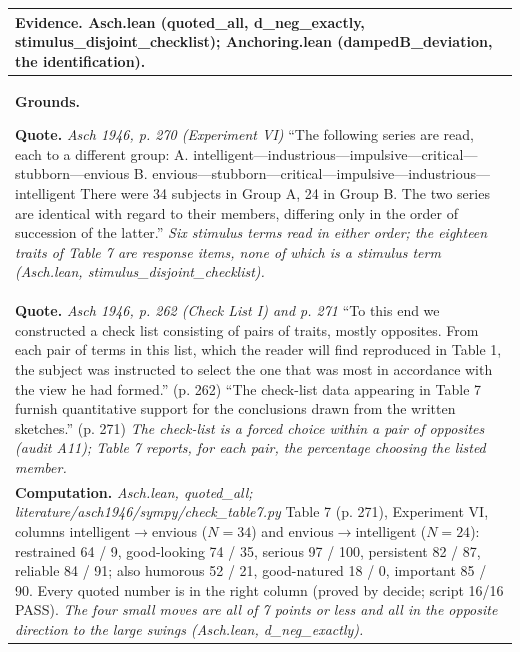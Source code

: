 \documentclass[10pt]{article}
\theoremstyle{definition}
\newlength{\fullw}\setlength{\fullw}{25.9cm}
\begin{document}
{\begin{longtable}{|p{0.9cm}|p{12.2cm}|p{12.2cm}|}
\multicolumn{3}{|p{\fullw}|}{\textbf{Evidence.} Asch.lean (quoted\_all, d\_neg\_exactly, stimulus\_disjoint\_checklist); Anchoring.lean (dampedB\_deviation, the identification).} \\ \hline
\multicolumn{3}{|p{\fullw}|}{\textbf{Grounds.}\par \textbf{Quote.} \textit{Asch 1946, p. 270 (Experiment VI)} \newline ``The following series are read, each to a different group: A. intelligent---industrious---impulsive---critical---stubborn---envious B. envious---stubborn---critical---impulsive---industrious---intelligent There were 34 subjects in Group A, 24 in Group B. The two series are identical with regard to their members, differing only in the order of succession of the latter.'' \newline \textit{Six stimulus terms read in either order; the eighteen traits of Table 7 are response items, none of which is a stimulus term (Asch.lean, stimulus\_disjoint\_checklist).}} \\
\multicolumn{3}{|p{\fullw}|}{\textbf{Quote.} \textit{Asch 1946, p. 262 (Check List I) and p. 271} \newline ``To this end we constructed a check list consisting of pairs of traits, mostly opposites. From each pair of terms in this list, which the reader will find reproduced in Table 1, the subject was instructed to select the one that was most in accordance with the view he had formed.'' (p. 262) ``The check-list data appearing in Table 7 furnish quantitative support for the conclusions drawn from the written sketches.'' (p. 271) \newline \textit{The check-list is a forced choice within a pair of opposites (audit A11); Table 7 reports, for each pair, the percentage choosing the listed member.}} \\
\multicolumn{3}{|p{\fullw}|}{\textbf{Computation.} \textit{Asch.lean, quoted\_all; literature/asch1946/sympy/check\_table7.py} \newline Table 7 (p. 271), Experiment VI, columns intelligent$\to$envious ($N = 34$) and envious$\to$intelligent ($N = 24$): restrained 64 / 9, good-looking 74 / 35, serious 97 / 100, persistent 82 / 87, reliable 84 / 91; also humorous 52 / 21, good-natured 18 / 0, important 85 / 90. Every quoted number is in the right column (proved by decide; script 16/16 PASS). \newline \textit{The four small moves are all of 7 points or less and all in the opposite direction to the large swings (Asch.lean, d\_neg\_exactly).}} \\

\end{longtable}}
\end{document}
